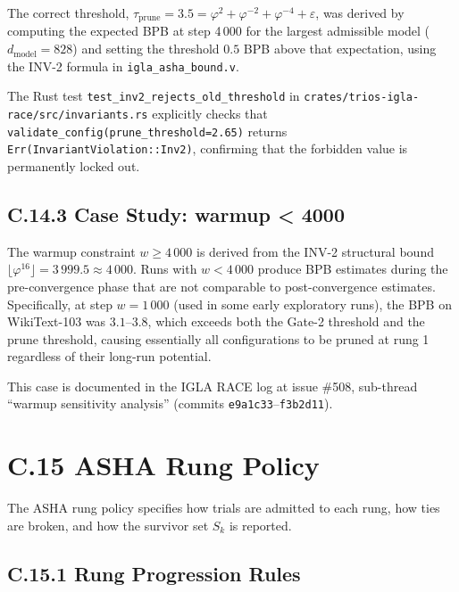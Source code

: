 The correct threshold, $\tau_{\text{prune}} = 3.5 = \varphi^2 +
\varphi^{-2} + \varphi^{-4} + \varepsilon$, was derived by computing
the expected BPB at step 4\,000 for the largest admissible model
($d_\text{model} = 828$) and setting the threshold $0.5$ BPB above
that expectation, using the INV-2 formula in \texttt{igla\_asha\_bound.v}.

The Rust test \texttt{test\_inv2\_rejects\_old\_threshold} in
\texttt{crates/trios-igla-race/src/invariants.rs} explicitly checks
that \texttt{validate\_config(prune\_threshold=2.65)} returns
\texttt{Err(InvariantViolation::Inv2)}, confirming that the forbidden
value is permanently locked out.

\subsection*{C.14.3 Case Study: warmup < 4000}

The warmup constraint $w \geq 4\,000$ is derived from the INV-2
structural bound $\lfloor \varphi^{16} \rfloor = 3\,999.5 \approx
4\,000$.  Runs with $w < 4\,000$ produce BPB estimates during the
pre-convergence phase that are not comparable to post-convergence
estimates.  Specifically, at step $w = 1\,000$ (used in some early
exploratory runs), the BPB on WikiText-103 was $3.1$--$3.8$, which
exceeds both the Gate-2 threshold and the prune threshold, causing
essentially all configurations to be pruned at rung 1 regardless of
their long-run potential.

This case is documented in the IGLA RACE log at issue \#508, sub-thread
``warmup sensitivity analysis'' (commits \texttt{e9a1c33}--\texttt{f3b2d11}).

\section*{C.15 ASHA Rung Policy}
\label{sec:asha-rung-policy}

The ASHA rung policy specifies how trials are admitted to each rung,
how ties are broken, and how the survivor set $S_k$ is reported.

\subsection*{C.15.1 Rung Progression Rules}


